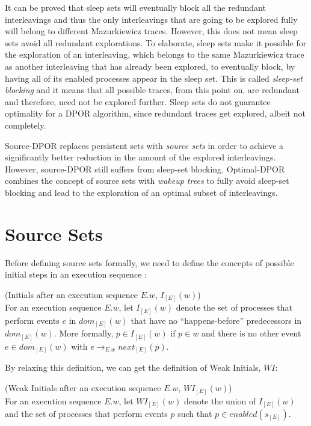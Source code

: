 It can be proved \cite{Godefroid1996} that sleep sets will eventually block all the redundant interleavings and thus 
the only interleavings that are going to be explored fully will belong to different Mazurkiewicz traces.
However, this does not mean sleep sets avoid all redundant explorations. To elaborate, sleep sets 
make it possible for the exploration of an interleaving, which belongs to the same Mazurkiewicz trace as another
interleaving that has already been explored, to eventually block, by having all of its enabled processes
appear in the sleep set. This is called \textit{sleep-set blocking} and it means that all possible traces, from this point on,
are redundant and therefore, need not be explored further. Sleep sets do not guarantee optimality 
for a DPOR algorithm, since redundant traces get explored, albeit not completely.

Source-DPOR \cite{AbdullaAronisJohnssonSagonasDPOR2014} replaces persistent sets with \textit{source sets} in order to achieve a 
significantly better reduction in the amount of the explored interleavings. However, source-DPOR still suffers from sleep-set 
blocking. Optimal-DPOR \cite{AbdullaAronisJohnssonSagonasDPOR2014} 
combines the concept of source sets with \textit{wakeup trees} to fully avoid sleep-set blocking and lead to the exploration
of an optimal subset of interleavings.

\section{Source Sets}

Before defining source sets formally, we need to define the concepts 
of possible initial steps in an execution sequence \cite{AbdullaAronisJohnssonSagonasDPOR2014}:

\begin{definition}{(Initials after an execution sequence $E.w$, $I_{[E]}(w)$)}\\
For an execution sequence $E.w$, let $I_{[E]}(w)$ denote the set of
processes that perform events $e$ in $dom_{[E]}(w)$ that have no
“happens-before” predecessors in $dom_{[E]}(w)$. More formally,
$p \in I_{[E]}(w)$ if $p \in w$ and there is no other event $e \in dom_{[E]}(w)$ with
$e \rightarrow_{E.w} next_{[E]}(p)$.
\end{definition}

By relaxing this definition, we can get the definition of Weak Initials, $WI$:

\begin{definition}{(Weak Initials after an execution sequence $E.w$, $WI_{[E]}(w)$)}\\
For an execution sequence $E.w$, let $WI_{[E]}(w)$ denote the union of $I_{[E]}(w)$ and the set of
processes that perform events $p$ such that $p \in enabled(s_{[E]}) $.
\end{definition}

